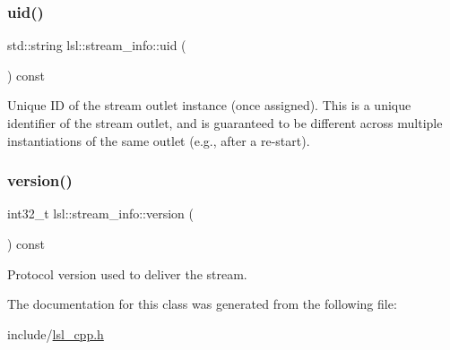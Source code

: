 \subsubsection{\texorpdfstring{uid()}{uid()}}
{\footnotesize\ttfamily std\+::string lsl\+::stream\+\_\+info\+::uid (\begin{DoxyParamCaption}{ }\end{DoxyParamCaption}) const\hspace{0.3cm}{\ttfamily [inline]}}

Unique ID of the stream outlet instance (once assigned). This is a unique identifier of the stream outlet, and is guaranteed to be different across multiple instantiations of the same outlet (e.\+g., after a re-\/start). \mbox{\label{classlsl_1_1stream__info_aabd83f83d0abe8671e766e97f471dea9}} 
\subsubsection{\texorpdfstring{version()}{version()}}
{\footnotesize\ttfamily int32\+\_\+t lsl\+::stream\+\_\+info\+::version (\begin{DoxyParamCaption}{ }\end{DoxyParamCaption}) const\hspace{0.3cm}{\ttfamily [inline]}}

Protocol version used to deliver the stream. 

The documentation for this class was generated from the following file\+:\begin{DoxyCompactItemize}
\item 
include/\hyperlink{lsl__cpp_8h}{lsl\+\_\+cpp.\+h}\end{DoxyCompactItemize}
